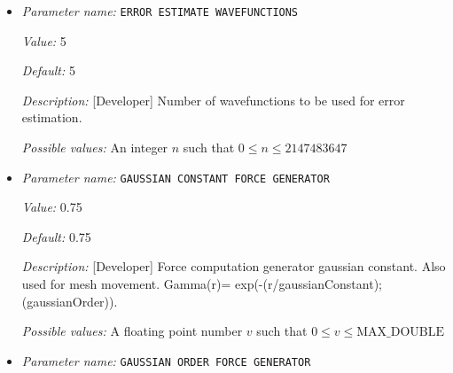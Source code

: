 \begin{itemize}
{\it Value:} 0.0


{\it Default:} 0.0


{\it Description:} [Advanced] Mesh size of the base mesh on which refinement is performed. For the default value of 0.0, a heuristically determined base mesh size is used, which is good enough for most cases. Standard users do not need to tune this parameter. Units: a.u.


{\it Possible values:} A floating point number $v$ such that $0 \leq v \leq 20$
\item {\it Parameter name:} {\tt ERROR ESTIMATE WAVEFUNCTIONS}
\label{parameters:Finite element mesh parameters/Auto mesh generation parameters/ERROR ESTIMATE WAVEFUNCTIONS}
\label{parameters:Finite_20element_20mesh_20parameters/Auto_20mesh_20generation_20parameters/ERROR_20ESTIMATE_20WAVEFUNCTIONS}


{\it Value:} 5


{\it Default:} 5


{\it Description:} [Developer] Number of wavefunctions to be used for error estimation.


{\it Possible values:} An integer $n$ such that $0\leq n \leq 2147483647$
\item {\it Parameter name:} {\tt GAUSSIAN CONSTANT FORCE GENERATOR}
\label{parameters:Finite element mesh parameters/Auto mesh generation parameters/GAUSSIAN CONSTANT FORCE GENERATOR}
\label{parameters:Finite_20element_20mesh_20parameters/Auto_20mesh_20generation_20parameters/GAUSSIAN_20CONSTANT_20FORCE_20GENERATOR}


{\it Value:} 0.75


{\it Default:} 0.75


{\it Description:} [Developer] Force computation generator gaussian constant. Also used for mesh movement. Gamma(r)= exp(-(r/gaussianConstant);(gaussianOrder)).


{\it Possible values:} A floating point number $v$ such that $0 \leq v \leq \text{MAX\_DOUBLE}$
\item {\it Parameter name:} {\tt GAUSSIAN ORDER FORCE GENERATOR}
\label{parameters:Finite element mesh parameters/Auto mesh generation parameters/GAUSSIAN ORDER FORCE GENERATOR}
\label{parameters:Finite_20element_20mesh_20parameters/Auto_20mesh_20generation_20parameters/GAUSSIAN_20ORDER_20FORCE_20GENERATOR}



\end{itemize}
